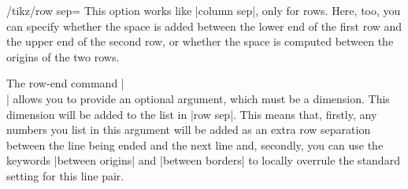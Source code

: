 \begin{key}{/tikz/row sep=}
    This option works like |column sep|, only for rows. Here, too, you can
    specify whether the space is added between the lower end of the first row
    and the upper end of the second row, or whether the space is computed
    between the origins of the two rows.
\begin{codeexample}[]
\end{codeexample}
\begin{codeexample}[]
\end{codeexample}
\end{key}

The row-end command |\\| allows you to provide an optional argument, which must
be a dimension. This dimension will be added to the list in |row sep|. This
means that, firstly, any numbers you list in this argument will be added as an
extra row separation between the line being ended and the next line and,
secondly, you can use the keywords |between origins| and |between borders| to
locally overrule the standard setting for this line pair.
%
\begin{codeexample}[]
\end{codeexample}

